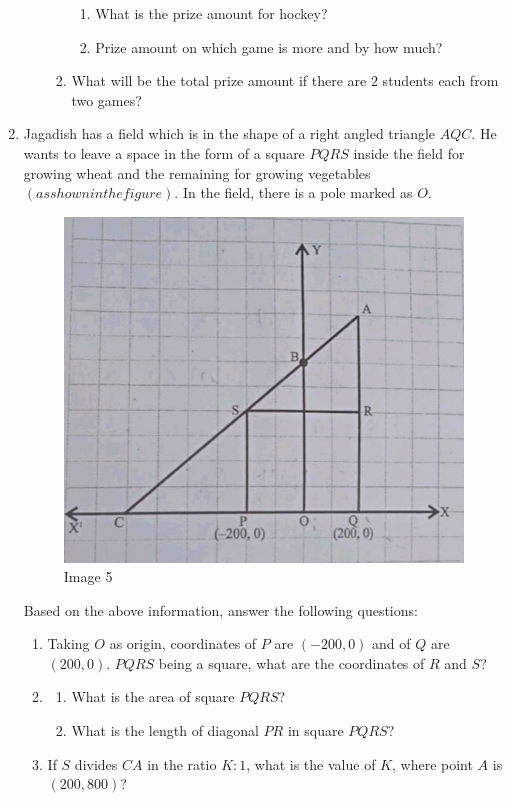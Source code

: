 \documentclass[12pt,-letter paper]{article}
\providecommand{\brak}[1]{\ensuremath{\left(#1\right)}}
\begin{document}
\begin{enumerate}
\begin{enumerate}
\begin{enumerate}
\begin{enumerate}
\item
What is the prize amount for hockey?
\item
Prize amount on which game is more and by how much?
\end{enumerate}
\item
What will be the total prize amount if there are $2$ students each from two games?
\end{enumerate}
\end{enumerate}
\newpage
\item
Jagadish has a field which is in the shape of a right angled triangle $AQC$. He wants to leave a space in the form of a square $PQRS$ inside the field for growing wheat and the remaining for growing vegetables \brak{as shown in the figure}. In the field, there is a pole marked as $O$.
\begin{figure}[h!]
\centering
\includegraphics[width=\columnwidth]{img5.jpg}
\caption{Image 5}
\end{figure}
Based on the above information, answer the following questions:
\begin{enumerate}
\item
Taking $O$ as origin, coordinates of $P$ are \brak{-200,0} and of $Q$ are \brak{200,0}. $PQRS$ being a square, what are the coordinates of $R$ and $S$?
\item
\begin{enumerate}
\item
What is the area of square $PQRS$?
\item
What is the length of diagonal $PR$ in square $PQRS$?
\end{enumerate}
\item
If $S$ divides $CA$ in the ratio $K:1$, what is the value of $K$, where point $A$ is \brak{200,800}?
\end{enumerate}

\end{enumerate}
\end{document}

